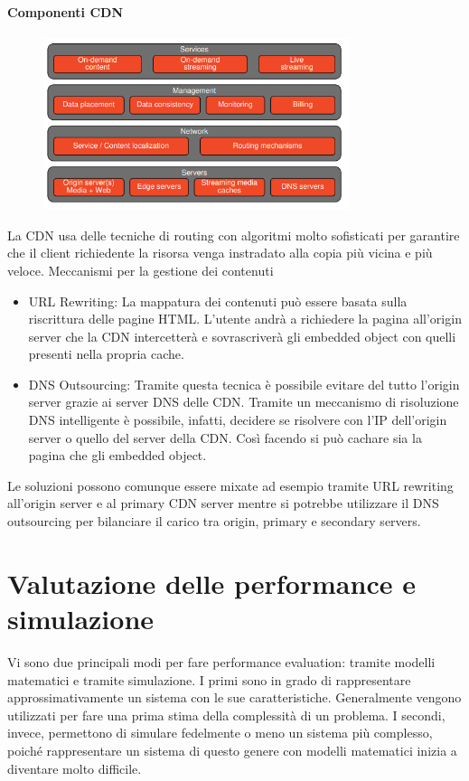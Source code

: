 \documentclass{article}
\begin{document}
		\paragraph{Componenti CDN}
		\begin{figure}[ht]
		    \centering
		    \includegraphics[width=0.8\textwidth]{SAC_A4_cdn_components.png}
		\end{figure}
		La CDN usa delle tecniche di routing con algoritmi molto sofisticati per garantire che il client richiedente la risorsa venga instradato alla copia più vicina e più veloce.
		Meccanismi per la gestione dei contenuti
		\begin{itemize}
			\item URL Rewriting: La mappatura dei contenuti può essere basata sulla riscrittura delle pagine HTML. L'utente andrà a richiedere la pagina all'origin server che la CDN intercetterà e sovrascriverà gli embedded object con quelli presenti nella propria cache.
			\item DNS Outsourcing: Tramite questa tecnica è possibile evitare del tutto l'origin server grazie ai server DNS delle CDN. Tramite un meccanismo di risoluzione DNS intelligente è possibile, infatti, decidere se risolvere con l'IP dell'origin server o quello del server della CDN. Così facendo si può cachare sia la pagina che gli embedded object.
		\end{itemize}
		Le soluzioni possono comunque essere mixate ad esempio tramite URL rewriting all'origin server e al primary CDN server mentre si potrebbe utilizzare il DNS outsourcing per bilanciare il carico tra origin, primary e secondary servers. 
		\newpage
		
		\section{Valutazione delle performance e simulazione}
		Vi sono due principali modi per fare performance evaluation: tramite modelli matematici e tramite
		simulazione.
		I primi sono in grado di rappresentare approssimativamente un sistema con le sue caratteristiche.
		Generalmente vengono utilizzati per fare una prima stima della complessità di un problema.
		I secondi, invece, permettono di simulare fedelmente o meno un sistema più complesso, poiché
		rappresentare un sistema di questo genere con modelli matematici inizia a diventare molto difficile.
		
\end{document}

